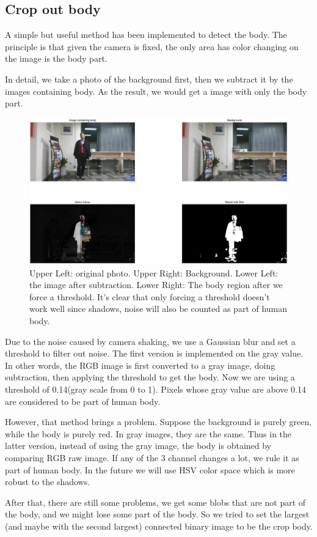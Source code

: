 \documentclass[conference,compsoc]{IEEEtran}
\begin{document}
	\subsection{Crop out body}
	\par
	A simple but useful method has been implemented to detect the body. The principle is that given the camera is fixed, the only area has color changing on the image is the body part.
	\par
	In detail, we take a photo of the background first, then we subtract it by the images containing body. As the result, we would get a image with only the body part.
	\begin{figure}[h]
		\centering
		\includegraphics[width=\linewidth]{./Pic/CropBody.png}
		\caption{Upper Left: original photo. Upper Right: Background. Lower Left: the image after subtraction. Lower Right: The body region after we force a threshold. It's clear that only forcing a threshold doesn't work well since shadows, noise will also be counted as part of human body.}
	\end{figure}
	\par
		Due to the noise caused by camera shaking, we use a Gaussian blur and set a threshold to filter out noise. 
		The first version is implemented on the gray value. In other words, the RGB image is first converted to a gray image, doing subtraction, then applying the threshold to get the body.
		Now we are using a threshold of 0.14(gray scale from 0 to 1). 
		Pixels whose gray value are above 0.14 are considered to be part of human body.
	\par
		However, that method brings a problem. Suppose the background is purely green, while the body is purely red. 
		In gray images, they are the same. 
		Thus in the latter version, instead of using the gray image, the body is obtained by comparing RGB raw image. 
		If any of the 3 channel changes a lot, we rule it as part of human body. 
		In the future we will use HSV color space which is more robust to the shadows.
	\par
		After that, there are still some problems, we get some blobs that are not part of the body, and we might lose some part of the body. So we tried to set the largest (and maybe with the second largest) connected binary image to be the crop body.
\end{document}
